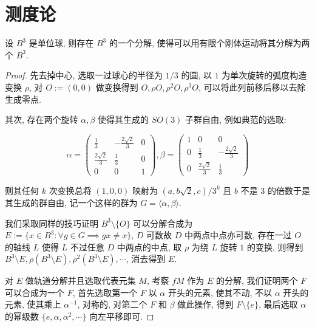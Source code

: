 \section{测度论}

\begin{example}
    设 \(B^3\) 是单位球, 则存在 \(B^3\) 的一个分解, 使得可以用有限个刚体运动将其分解为两个 \(B^3\).

    \begin{proof}
        先去掉中心, 选取一过球心的半径为 \(1/3\) 的圆, 以 \(1\) 为单次旋转的弧度构造变换 \(\rho\),
        对 \(O := (0,0)\) 做变换得到 \(O,\rho O, \rho^2 O, \rho^3 O\), 可以将此列前移后移以去除生成零点.

        其次, 存在两个旋转 \(\alpha,\beta\) 使得其生成的 \(SO(3)\) 子群自由, 例如典范的选取:

        \[
            \alpha = \begin{pmatrix}
                \frac{1}{3} & - \frac{2 \sqrt{2}}{3} & 0 \\
                \frac{2 \sqrt{2}}{3} & \frac{1}{3} & 0 \\
                0 & 0 & 1
            \end{pmatrix}, \beta = \begin{pmatrix}
                1 & 0 & 0 \\
                0 & \frac{1}{3} & - \frac{2 \sqrt{2}}{3} \\
                0 & \frac{2 \sqrt{2}}{3} & \frac{1}{3}
            \end{pmatrix}
        \]

        则其任何 \(k\) 次变换总将 \((1,0,0)\) 映射为 \((a,b \sqrt{2},c)/3^k\) 且 \(b\) 不是 \(3\) 的倍数于是其生成的群自由,
        记一个这样的群为 \(G = \langle \alpha, \beta \rangle\).

        我们采取同样的技巧证明 \(B^3 \setminus \{O\}\) 可以分解合成为 \(E := \{x \in B^3:\forall g \in G \implies g x \neq x\}\),
        \(D\) 可数故 \(D\) 中两点中点亦可数, 存在一过 \(O\) 的轴线 \(L\) 使得 \(L\) 不过任意 \(D\) 中两点的中点, 取 \(\rho\) 为绕 \(L\) 旋转 \(1\) 的变换,
        则得到 \(B^3 \setminus E, \rho (B^3 \setminus E), \rho^2 (B^3 \setminus E), \cdots\), 消去得到 \(E\).

        对 \(E\) 做轨道分解并且选取代表元集 \(M\), 考察 \(f M\) 作为 \(E\) 的分解, 
        我们证明两个 \(F\) 可以合成为一个 \(F\), 首先选取第一个 \(F\) 以 \(\alpha\) 开头的元素,
        使其不动, 不以 \(\alpha\) 开头的元素, 使其乘上 \(\alpha^{-1}\), 对称的, 对第二个 \(F\) 和 \(\beta\) 做此操作,
        得到 \(F \setminus \{e\}\), 最后选取 \(\alpha\) 的幂级数 \(\{e,\alpha,\alpha^2, \cdots\}\) 向左平移即可.
    \end{proof}
\end{example}

